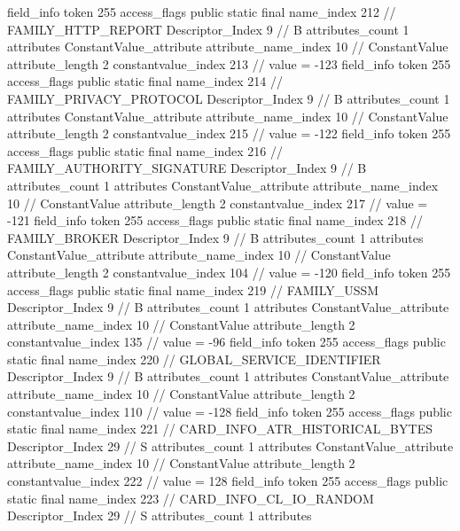 {{{{{{				}
			}
			field_info {
				token	255
				access_flags	public static final
				name_index	212		// FAMILY_HTTP_REPORT
				Descriptor_Index	9		// B
				attributes_count	1
				attributes {
				ConstantValue_attribute {
					attribute_name_index	10		// ConstantValue
					attribute_length	2
					constantvalue_index	213		// value = -123
				}
				}
			}
			field_info {
				token	255
				access_flags	public static final
				name_index	214		// FAMILY_PRIVACY_PROTOCOL
				Descriptor_Index	9		// B
				attributes_count	1
				attributes {
				ConstantValue_attribute {
					attribute_name_index	10		// ConstantValue
					attribute_length	2
					constantvalue_index	215		// value = -122
				}
				}
			}
			field_info {
				token	255
				access_flags	public static final
				name_index	216		// FAMILY_AUTHORITY_SIGNATURE
				Descriptor_Index	9		// B
				attributes_count	1
				attributes {
				ConstantValue_attribute {
					attribute_name_index	10		// ConstantValue
					attribute_length	2
					constantvalue_index	217		// value = -121
				}
				}
			}
			field_info {
				token	255
				access_flags	public static final
				name_index	218		// FAMILY_BROKER
				Descriptor_Index	9		// B
				attributes_count	1
				attributes {
				ConstantValue_attribute {
					attribute_name_index	10		// ConstantValue
					attribute_length	2
					constantvalue_index	104		// value = -120
				}
				}
			}
			field_info {
				token	255
				access_flags	public static final
				name_index	219		// FAMILY_USSM
				Descriptor_Index	9		// B
				attributes_count	1
				attributes {
				ConstantValue_attribute {
					attribute_name_index	10		// ConstantValue
					attribute_length	2
					constantvalue_index	135		// value = -96
				}
				}
			}
			field_info {
				token	255
				access_flags	public static final
				name_index	220		// GLOBAL_SERVICE_IDENTIFIER
				Descriptor_Index	9		// B
				attributes_count	1
				attributes {
				ConstantValue_attribute {
					attribute_name_index	10		// ConstantValue
					attribute_length	2
					constantvalue_index	110		// value = -128
				}
				}
			}
			field_info {
				token	255
				access_flags	public static final
				name_index	221		// CARD_INFO_ATR_HISTORICAL_BYTES
				Descriptor_Index	29		// S
				attributes_count	1
				attributes {
				ConstantValue_attribute {
					attribute_name_index	10		// ConstantValue
					attribute_length	2
					constantvalue_index	222		// value = 128
				}
				}
			}
			field_info {
				token	255
				access_flags	public static final
				name_index	223		// CARD_INFO_CL_IO_RANDOM
				Descriptor_Index	29		// S
				attributes_count	1
				attributes {
}}}}}}
